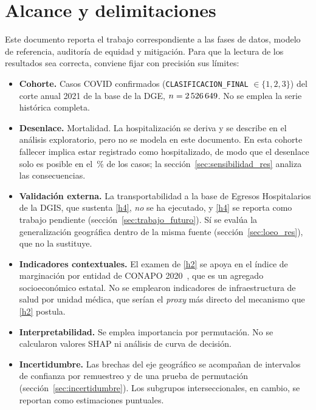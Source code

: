 \section{Alcance y delimitaciones}
\label{sec:alcance}

Este documento reporta el trabajo correspondiente a las fases de datos, modelo
de referencia, auditoría de equidad y mitigación. Para que la lectura de los
resultados sea correcta, conviene fijar con precisión sus límites:

\begin{itemize}[leftmargin=*]
  \item \textbf{Cohorte.} Casos COVID confirmados
    (\texttt{CLASIFICACION\_FINAL} $\in \{1,2,3\}$) del corte anual 2021 de la
    base de la DGE, $n=2\,526\,649$. No se emplea la serie histórica completa.
  \item \textbf{Desenlace.} Mortalidad. La hospitalización se deriva y se
    describe en el análisis exploratorio, pero no se modela en este documento.
    En esta cohorte fallecer implica estar registrado como hospitalizado, de modo
    que el desenlace solo es posible en el \fracHosp\,\% de los casos; la
    sección~\ref{sec:sensibilidad_res} analiza las consecuencias.
  \item \textbf{Validación externa.} La transportabilidad a la base de Egresos
    Hospitalarios de la DGIS, que sustenta \ref{h4}, \emph{no} se ha ejecutado, y
    \ref{h4} se reporta como trabajo pendiente (sección~\ref{sec:trabajo_futuro}).
    Sí se evalúa la generalización geográfica dentro de la misma fuente
    (sección~\ref{sec:loeo_res}), que no la sustituye.
  \item \textbf{Indicadores contextuales.} El examen de \ref{h2} se apoya en
    el índice de marginación por entidad de CONAPO 2020~\parencite{conapo2020}, que es
    un agregado socioeconómico estatal. No se emplearon indicadores de
    infraestructura de salud por unidad médica, que serían el \emph{proxy} más
    directo del mecanismo que \ref{h2} postula.
  \item \textbf{Interpretabilidad.} Se emplea importancia por permutación. No se
    calcularon valores SHAP ni análisis de curva de decisión.
  \item \textbf{Incertidumbre.} Las brechas del eje geográfico se acompañan de
    intervalos de confianza por remuestreo y de una prueba de permutación
    (sección~\ref{sec:incertidumbre}). Los subgrupos interseccionales, en cambio,
    se reportan como estimaciones puntuales.
\end{itemize}

